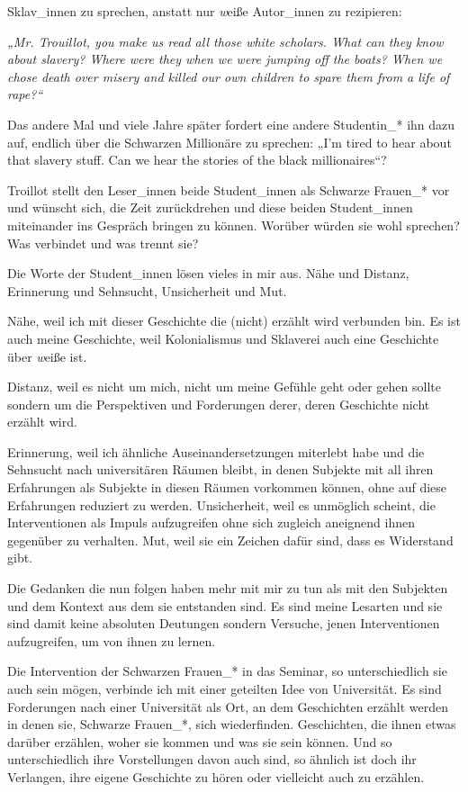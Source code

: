 Sklav\_innen zu sprechen, anstatt nur \textit{w}eiße Autor\_innen zu
rezipieren:
\begin{myenv}
  \textit{„Mr. Trouillot, you make us read all those white scholars. What can
they know about slavery? Where were they when we were jumping off the boats?
When we chose death over misery and killed our own children to spare them from
a life of rape?“\footnotemark{}}
\end{myenv}
Das andere Mal und viele Jahre später fordert eine andere
Studentin\_* ihn dazu auf, endlich über die Schwarzen Millionäre zu sprechen:
„I'm tired to hear about that slavery stuff. Can we hear the stories of the
black millionaires“?\footnotemark{}

Troillot stellt den Leser\_innen beide Student\_innen als Schwarze Frauen\_* vor
und wünscht sich, die Zeit zurückdrehen und diese beiden Student\_innen
miteinander ins Gespräch bringen zu können. Worüber würden sie wohl sprechen?
Was verbindet und was trennt sie?

Die Worte der Student\_innen lösen vieles in mir aus. Nähe und Distanz,
Erinnerung und Sehnsucht, Unsicherheit und Mut.

Nähe, weil ich mit dieser
Geschichte die (nicht) erzählt wird verbunden bin. Es ist auch meine
Geschichte, weil Kolonialismus und Sklaverei auch eine Geschichte über
\textit{w}eiße ist.

Distanz, weil es nicht um mich, nicht um meine Gefühle
geht oder gehen sollte sondern um die Perspektiven und Forderungen derer, deren
Geschichte nicht erzählt wird.

Erinnerung, weil ich ähnliche
Auseinandersetzungen miterlebt habe und die Sehnsucht nach universitären Räumen
bleibt, in denen Subjekte mit all ihren Erfahrungen als Subjekte in diesen
Räumen vorkommen können, ohne auf diese Erfahrungen reduziert zu werden.
Unsicherheit, weil es unmöglich scheint, die Interventionen als Impuls
aufzugreifen ohne sich zugleich aneignend ihnen gegenüber zu verhalten.  Mut,
weil sie ein Zeichen dafür sind, dass es Widerstand gibt.

Die Gedanken die nun
folgen haben mehr mit mir zu tun als mit den Subjekten und dem Kontext aus dem
sie entstanden sind. Es sind meine Lesarten und sie sind damit keine absoluten
Deutungen sondern Versuche, jenen Interventionen aufzugreifen, um von ihnen zu
lernen.

Die Intervention der Schwarzen Frauen\_* in das Seminar, so unterschiedlich sie
auch sein mögen, verbinde ich mit einer geteilten Idee von Universität. Es sind
Forderungen nach einer Universität als Ort, an dem Geschichten erzählt werden
in denen sie, Schwarze Frauen\_*, sich wiederfinden. Geschichten, die ihnen
etwas darüber erzählen, woher sie kommen und was sie sein können. Und so
unterschiedlich ihre Vorstellungen davon auch sind, so ähnlich ist doch ihr
Verlangen, ihre eigene Geschichte zu hören oder vielleicht auch zu erzählen.

